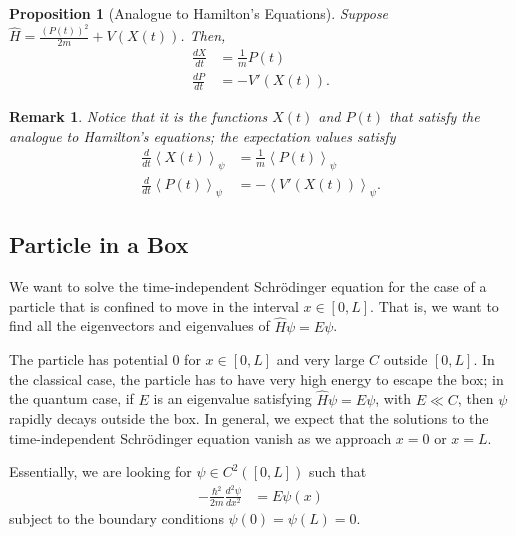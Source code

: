 \documentclass[10pt]{extarticle}
\newtheorem*{remark}{Remark}
\theoremstyle{plain}
\newtheorem*{proposition}{Proposition}%
\theoremstyle{definition}
\theoremstyle{remark}
\renewcommand{\newline}{\hfill\break}
\begin{document}
  \begin{proposition}[Analogue to Hamilton's Equations]
    Suppose $\hat{H} = \frac{\left(P(t)\right)^2}{2m} + V\left(X(t)\right)$. Then,
    \begin{align*}
      \frac{dX}{dt} &= \frac{1}{m}P(t)\\
      \frac{dP}{dt} &= -V'(X(t)).
    \end{align*}
  \end{proposition}
  \begin{remark}
    Notice that it is the functions $X(t)$ and $P(t)$ that satisfy the analogue to Hamilton's equations; the expectation values satisfy
    \begin{align*}
      \frac{d}{dt}\left\langle X(t)\right\rangle_{\psi} &= \frac{1}{m}\left\langle P(t)\right\rangle_{\psi}\\
      \frac{d}{dt}\left\langle P(t)\right\rangle_{\psi} &= -\left\langle V'(X(t))\right\rangle_{\psi}.
    \end{align*}
  \end{remark}
  \subsection{Particle in a Box}%
  We want to solve the time-independent Schrödinger equation for the case of a particle that is confined to move in the interval $x\in [0,L]$. That is, we want to find all the eigenvectors and eigenvalues of $\hat{H}\psi = E\psi$. \newline

  The particle has potential $0$ for $x\in [0,L]$ and very large $C$ outside $[0,L]$. In the classical case, the particle has to have very high energy to escape the box; in the quantum case, if $E$ is an eigenvalue satisfying $\hat{H}\psi = E\psi$, with $E \ll C$, then $\psi$ rapidly decays outside the box. In general, we expect that the solutions to the time-independent Schrödinger equation vanish as we approach $x = 0$ or $x=L$.\newline

  Essentially, we are looking for $\psi \in C^{2}([0,L])$ such that
  \begin{align*}
    -\frac{\hbar^2}{2m}\frac{d^2\psi}{dx^2} &= E\psi(x)
  \end{align*}
  subject to the boundary conditions $\psi(0) = \psi(L) = 0$.\newline
\end{document}
